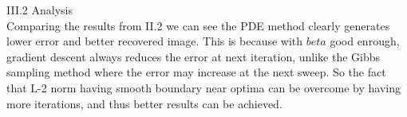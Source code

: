 \documentclass[12pt]{article}
\newenvironment{problem}[2][Part]{\begin{trivlist}
\item[\hskip \labelsep {\bfseries #1}\hskip \labelsep {\bfseries #2}]}{\end{trivlist}}
\begin{document}
\begin{problem}{III PDE}
\item{III.2 Analysis\\}
Comparing the results from II.2 we can see the PDE method clearly generates lower error and better recovered image. This is because with $beta$ good enrough, gradient descent always reduces the error at next iteration, unlike the Gibbs sampling method where the error may increase at the next sweep. So the fact that L-2 norm having smooth boundary near optima can be overcome by having more iterations, and thus better results can be achieved.
\end{problem}

 
\end{document}
